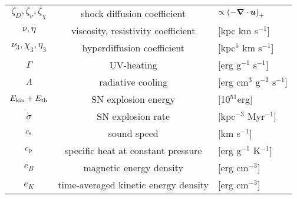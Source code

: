 \documentclass[preprint2]{aastex63}
\newcommand\latex{La\TeX}
\newcommand\ESK{E_{\rm kin}}
\newcommand\EST{E_{\rm th}}
\newcommand{\vect}[1]{{{\mbox{\boldmath $#1$}}}}%
\newcommand{\fag}[1]{\textcolor{midgreen}{FAG: #1}}
\begin{document}
\begin{table*}[h]
\begin{tabular}{ccl}
 $\zeta_{D},\zeta_{\nu},\zeta_{\chi}$ & shock diffusion coefficient& $\propto \left(-\vect\nabla\cdot\vect u\right)_+$\\
 $\nu,\eta$ & viscosity, resistivity coefficient& [kpc km s$^{-1}$]\\
 $\nu_3,\chi_3,\eta_3$ & hyperdiffusion coefficient& [kpc$^{5}$ km s$^{-1}$]\\
 $\Gamma$ & UV-heating& [erg g$^{-1}$ s$^{-1}$]\\
 $\Lambda$ & radiative cooling& [erg cm$^{3}$ g$^{-2}$ s$^{-1}$]\\
 $\ESK+\EST$ & SN explosion energy& [10$^{51}$erg]\\
 $\dot\sigma$ & SN explosion rate & [kpc$^{-3}$ Myr$^{-1}$]\\
 $c_{\rm s}$ & sound speed & [km s$^{-1}$]\\
 $c_{\rm p}$ & specific heat at constant pressure & [erg g$^{-1}$ K$^{-1}$]\\
 $e_B$ & magnetic energy density & [erg cm$^{-3}$]\\
 $\overline{e_K}$ & time-averaged kinetic energy density & [erg cm$^{-3}$]\\
\hline
\end{tabular}
\end{table*}


\end{document}
